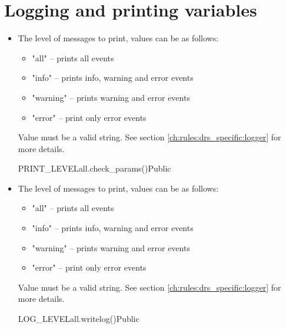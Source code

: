 \clearpage
\newpage
\section{Logging and printing variables}
\label{ch:variables:log_print}

\begin{itemize}

\item {} 
{The level of messages to print, values can be as follows:
\begin{itemize}
	\item "all" -- prints all events
	\item "info" -- prints info, warning and error events
	\item "warning" -- prints warning and error events
	\item "error" -- print only error events
\end{itemize}
Value must be a valid string. \ifdevguide See section \ref{ch:rules:drs_specific:logger} for more details. \fi}
{PRINT\_LEVEL}{all}{\AllRecipes}{\configtxtfile}{\spirouConfig.check\_params()}{Public}

\item {} 
{The level of messages to print, values can be as follows:
\begin{itemize}
	\item "all" -- prints all events
	\item "info" -- prints info, warning and error events
	\item "warning" -- prints warning and error events
	\item "error" -- print only error events
\end{itemize}
Value must be a valid string. \ifdevguide See section \ref{ch:rules:drs_specific:logger} for more details. \fi}
{LOG\_LEVEL}{all}{\AllRecipes}{\configtxtfile}{\spirouConfig.writelog()}{Public}


\ifdevguide


\end{itemize}
